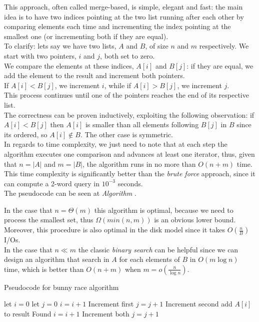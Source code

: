 This approach, often called merge-based, is simple, elegant and fast: the main idea is to have two indices pointing at the two list running after each other by comparing elements each time and incrementing the index pointing at the smallest one (or incrementing both if they are equal).\\ 
To clarify: lets say we have two lists, $A$ and $B$, of size $n$ and $m$ respectively. We start with two pointers, $i$ and $j$, both set to zero. \\
We compare the elements at these indices, $A[i]$ and $B[j]$: if they are equal, we add the element to the result and increment both pointers. \\
If $A[i] < B[j]$, we increment $i$, while if $A[i] > B[j]$, we increment $j$. \\
This process continues until one of the pointers reaches the end of its respective list.\\
The correctness can be proven inductively, exploiting the following observation: if $A[i] < B[j]$ then $A[i]$ is smaller than all elements following $B[j]$ in $B$ since its ordered, so $A[i] \notin B$. The other case is symmetric. \\
In regards to time complexity, we just need to note that at each step the algorithm executes one comparison and advances at least one iterator, thus, given that $n=|A|$ and $m=|B|$, the algorithm runs in no more than $O(n+m)$ time.\\
This time complexity is significantly better than the \textit{brute force}  approach, since it can compute a 2-word query in $10^{-3}$ seconds. \\
The pseudocode can be seen at \textit{Algorithm} .

In the case that $n=\Theta (m)$ this algorithm is optimal, because we need to process the smallest set, thus $\Omega(min(n,m))$ is an obvious lower bound. Moreover, this procedure is also optimal in the disk model since it takes $O(\frac{n}{B})$ I/Os. \\
In the case that $n \ll m$ the classic \textit{binary search} can be helpful since we can design an algorithm that search in $A$ for each elements of $B$ in $O(m \log n)$ time, which is better than $O(n+m)$ when $m=o(\frac{n}{\log n})$.

\begin{algorithm}
    \captionsetup{labelsep=newline}
    \caption{Pseudocode for bunny race algorithm \label{alg:bunnyrace}}
    \begin{algorithmic}[1]
        \State let $i=0$ 
        \State let $j=0$ 
                \State $i=i+1$ \Comment Increment first
                \State $j=j+1$ \Comment Increment second
            \Else
                \State add $A[i]$ to result \Comment Found
                \State $i=i+1$  \Comment Increment both
                \State $j=j+1$
            \EndIf
        \EndWhile
    \end{algorithmic}
\end{algorithm}

